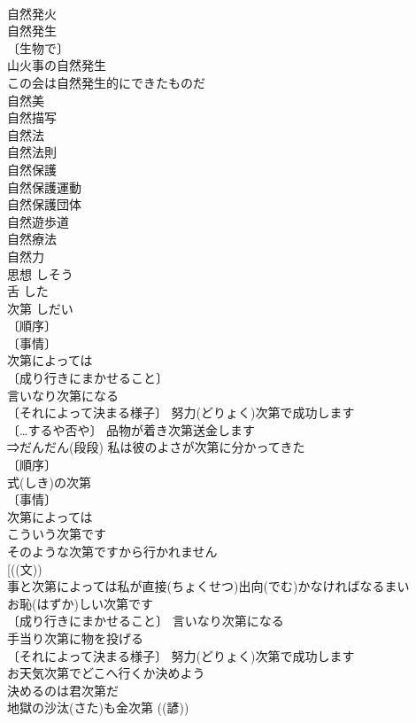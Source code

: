 \documentclass[8pt]{extreport}
\begin{document}
\begin{CJK}{UTF8}{min}
\\	自然発火 
\\	自然発生 
\\	〔生物で〕
\\	山火事の自然発生 
\\	この会は自然発生的にできたものだ 
\\	自然美 
\\	自然描写 
\\	自然法 
\\	自然法則 
\\	自然保護 
\\	自然保護運動 
\\	自然保護団体 
\\	自然遊歩道 
\\	自然療法 
\\	自然力 
\\	思想	しそう	
\\	舌	した	
\\	次第	しだい	
\\	〔順序〕
\\	〔事情〕
\\	次第によっては 
\\	〔成り行きにまかせること〕　
\\	言いなり次第になる 
\\	〔それによって決まる様子〕 努力(どりょく)次第で成功します 
\\	〔…するや否や〕 品物が着き次第送金します 
\\	⇒だんだん(段段) 私は彼のよさが次第に分かってきた 
\\	〔順序〕
\\	式(しき)の次第 
\\	〔事情〕
\\	次第によっては 
\\	こういう次第です 
\\	そのような次第ですから行かれません 
\\	[((文))
\\	事と次第によっては私が直接(ちょくせつ)出向(でむ)かなければなるまい 
\\	お恥(はずか)しい次第です 
\\	〔成り行きにまかせること〕 言いなり次第になる 
\\	手当り次第に物を投げる 
\\	〔それによって決まる様子〕 努力(どりょく)次第で成功します 
\\	お天気次第でどこへ行くか決めよう 
\\	決めるのは君次第だ 
\\	地獄の沙汰(さた)も金次第 ((諺)) 

\end{CJK}
\end{document}
